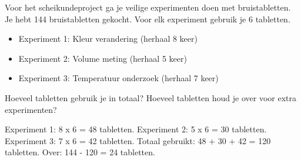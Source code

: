 \begin{opgave}
Voor het scheikundeproject ga je veilige experimenten doen met bruistabletten. Je hebt 144
bruistabletten gekocht. Voor elk experiment gebruik je 6 tabletten.

\begin{itemize}
\item Experiment 1: Kleur verandering (herhaal 8 keer)
\item Experiment 2: Volume meting (herhaal 5 keer)  
\item Experiment 3: Temperatuur onderzoek (herhaal 7 keer)
\end{itemize}

Hoeveel tabletten gebruik je in totaal? Hoeveel tabletten houd je over voor extra
experimenten?
\end{opgave}

\begin{oplossing}
Experiment 1: 8 x 6 = 48 tabletten.
Experiment 2: 5 x 6 = 30 tabletten.
Experiment 3: 7 x 6 = 42 tabletten.
Totaal gebruikt: 48 + 30 + 42 = 120 tabletten.
Over: 144 - 120 = 24 tabletten.
\end{oplossing}